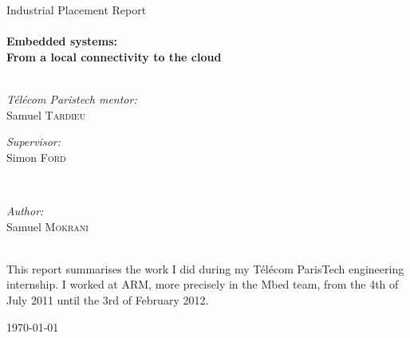 \begin{titlepage}
\begin{center}
\LARGE Industrial Placement Report\\[0.5cm]
\HRule \\
{ \huge \bfseries Embedded systems: \\ From a local connectivity to the cloud}\\

\HRule \\[1cm]

\begin{minipage}{0.4\textwidth}
\begin{flushleft} \large
\emph{T\'{e}l\'{e}com Paristech mentor:}\\
Samuel \textsc{Tardieu}
\end{flushleft}
\end{minipage}
\begin{minipage}{0.4\textwidth}
\begin{flushright} \large
\emph{Supervisor:} \\
Simon \textsc{Ford}
\end{flushright}
\end{minipage}\\[1.0cm]


\begin{minipage}{0.4\textwidth}
\begin{center} \large
\emph{Author:} \\
Samuel \textsc{Mokrani}
\end{center}
\end{minipage}\\[3.0cm]

\large This report summarises the work I did during my T\'{e}l\'{e}com ParisTech engineering internship. I worked at ARM, more precisely in the Mbed team, from the 4th of July 2011 until the 3rd of February 2012.



\vfill

{\large \today}

\end{center}

\end{titlepage}